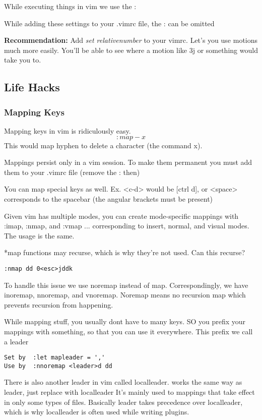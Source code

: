 \documentclass[12pt, letterpaper]{article}
\begin{document}
While executing things in vim we use the :

While adding these settings to your .vimrc file, the : can be omitted

\textbf{Recommendation:} Add \textit{set relativenumber} to your vimrc. Let's
you use motions much more easily. You'll be able to see where a motion like 3j
or something would take you to.

\subsection{Life Hacks}
\subsubsection{Mapping Keys}

Mapping keys in vim is ridiculously easy.
$$:map - x$$
This would map hyphen to delete a character (the command x).

Mappings persist only in a vim session. To make them permanent you must add
them to your .vimrc file (remove the : then)

You can map special keys as well. Ex. <c-d> would be [ctrl d], or <space>
corresponds to the spacebar (the angular brackets must be present)

Given vim has multiple modes, you can create mode-specific mappings with :imap,
:nmap, and :vmap ... corresponding to insert, normal, and visual modes. The
usage is the same.


*map functions may recurse, which is why they're not used. Can this recurse?
\begin{verbatim}
:nmap dd 0<esc>jddk
\end{verbatim}


To handle this issue we use noremap instead of map. Correspondingly, we have
inoremap, nnoremap, and vnoremap. Noremap means no recursion map which prevents
recursion from happening.


While mapping stuff, you usually dont have to many keys. SO you prefix your
mappings with something, so that you can use it everywhere. This prefix we call
a leader

\begin{verbatim}
Set by  :let mapleader = ','
Use by  :nnoremap <leader>d dd
\end{verbatim}

There is also another leader in vim called localleader.
works the same way as leader, just replace with localleader
It's mainly used to mappings that take effect in only some types of files.
Basically leader takes precedence over localleader, which is why localleader is
often used while writing plugins.
\end{document}
